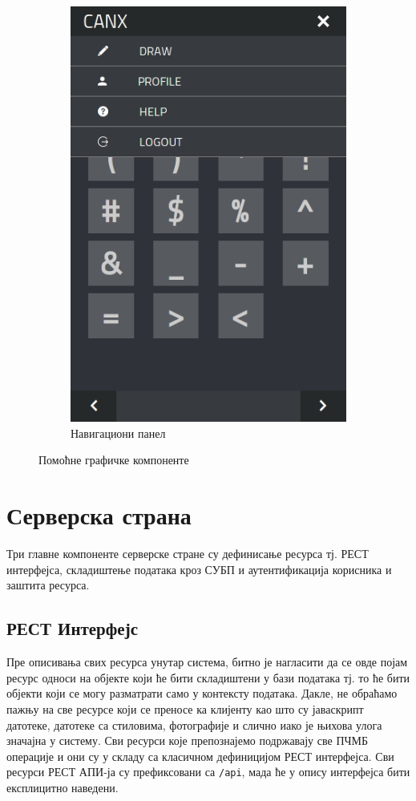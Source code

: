 \documentclass[a4paper]{article}
\begin{document}
\begin{figure}
\begin{subfigure}{.5\textwidth}
  \includegraphics[width=.9\linewidth]{hamburger}
  \caption{Навигациони панел}
  \label{fig:sub2}
\end{subfigure}
\caption{Помоћне графичке компоненте}
\label{fig:test}
\end{figure}

\section{Серверска страна}
Три главне компоненте серверске стране су дефинисање ресурса тј. РЕСТ интерфејса, складиштење података кроз СУБП и аутентификација корисника и заштита ресурса.

\subsection{РЕСТ Интерфејс}
Пре описивања свих ресурса унутар система, битно је нагласити да се овде појам ресурс односи на објекте који ће бити складиштени у бази података тј. то ће бити објекти који се могу разматрати само у контексту података. Дакле, не обраћамо пажњу на све ресурсе који се преносе ка клијенту као што су јаваскрипт датотеке, датотеке са стиловима, фотографије и слично иако је њихова улога значајна у систему. Сви ресурси које препознајемо  подржавају све ПЧМБ операције и они су у складу са класичном дефиницијом РЕСТ интерфејса. Сви ресурси РЕСТ АПИ-ја су префиксовани са \lstinline[basicstyle=\ttfamily\color{black}]|/api|,  мада ће у опису интерфејса бити експлицитно наведени.
\end{document}
